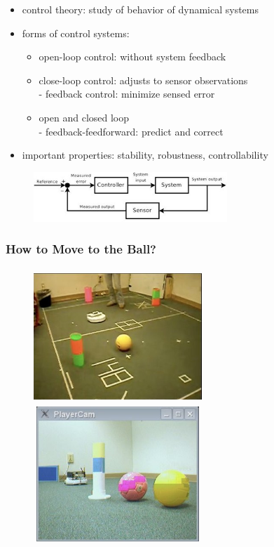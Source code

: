\begin{itemize}
\item control theory: study of behavior of dynamical systems
\item forms of control systems:
\begin{itemize}
\item open-loop control: without system feedback
\item close-loop control: adjusts to sensor observations\\
- feedback control: minimize sensed error
\item open and closed loop\\
- feedback-feedforward: predict and correct
\end{itemize}
\item important properties: stability, robustness, controllability
\end{itemize}

\begin{figure}[!h]
\centering
\includegraphics[width=0.65\textwidth]{figures/6_control_theory.jpg}
\end{figure}

\subsubsection{How to Move to the Ball?}

\begin{figure}[!h]
\centerline{
\mbox{\includegraphics[height=2.0in,width=2.5in]{figures/6_move_to_objs1.jpg}}
\mbox{\includegraphics[height=2.0in,width=2.5in]{figures/6_move_to_objs2.jpg}}
}
\end{figure}

